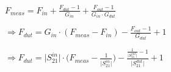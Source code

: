 \documentclass{article}
\begin{document}
$ F_{meas} = F_{in} + \frac{F_{dut}-1}{G_{in}} + \frac{F_{out}-1}{G_{in} \cdot G_{dut}} $

$ \Rightarrow F_{dut} = G_{in} \cdot (F_{meas} - F_{in}) - \frac{F_{out} - 1}{G_{dut}} + 1  $

$ \Rightarrow F_{dut} = \lvert S_{21}^{in} \rvert \cdot \Big( F_{meas} - \frac{1}{\lvert S_{21}^{in} \rvert} \Big)  - \frac{\frac{1}{\lvert S_{21}^{out} \rvert} - 1}{\lvert S_{21}^{dut} \rvert} + 1 $
\end{document}
